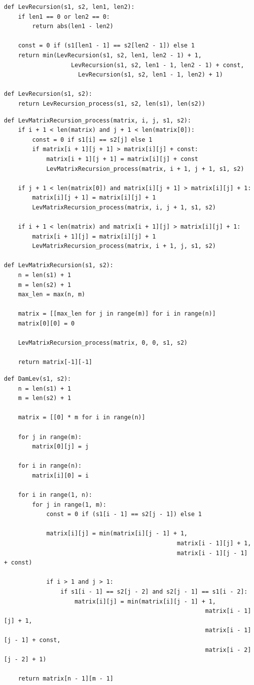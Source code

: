 \documentclass[12pt]{report}
\begin{document}
\begin{lstlisting}[label=some-code, caption = Расстояние Левенштейна - рекурсивный расчёт по формуле]
def LevRecursion(s1, s2, len1, len2):
	if len1 == 0 or len2 == 0:
		return abs(len1 - len2)
	
	const = 0 if (s1[len1 - 1] == s2[len2 - 1]) else 1
	return min(LevRecursion(s1, s2, len1, len2 - 1) + 1,
			   	   LevRecursion(s1, s2, len1 - 1, len2 - 1) + const,
			   		 LevRecursion(s1, s2, len1 - 1, len2) + 1)
			   
def LevRecursion(s1, s2):
	return LevRecursion_process(s1, s2, len(s1), len(s2))
\end{lstlisting}

\begin{lstlisting}[label=some-code, caption = Расстояние Левенштейна - алгоритм с рекурсией и матрицей]
def LevMatrixRecursion_process(matrix, i, j, s1, s2):
	if i + 1 < len(matrix) and j + 1 < len(matrix[0]):
		const = 0 if s1[i] == s2[j] else 1
		if matrix[i + 1][j + 1] > matrix[i][j] + const:
			matrix[i + 1][j + 1] = matrix[i][j] + const
			LevMatrixRecursion_process(matrix, i + 1, j + 1, s1, s2)
	
	if j + 1 < len(matrix[0]) and matrix[i][j + 1] > matrix[i][j] + 1:
		matrix[i][j + 1] = matrix[i][j] + 1
		LevMatrixRecursion_process(matrix, i, j + 1, s1, s2)
	
	if i + 1 < len(matrix) and matrix[i + 1][j] > matrix[i][j] + 1:
		matrix[i + 1][j] = matrix[i][j] + 1
		LevMatrixRecursion_process(matrix, i + 1, j, s1, s2)
		
def LevMatrixRecursion(s1, s2):
	n = len(s1) + 1
	m = len(s2) + 1
	max_len = max(n, m)
	
	matrix = [[max_len for j in range(m)] for i in range(n)]
	matrix[0][0] = 0
	
	LevMatrixRecursion_process(matrix, 0, 0, s1, s2)
	
	return matrix[-1][-1]
\end{lstlisting}

\begin{lstlisting}[label=some-code, caption = Расстояние Дамерау-Левенштейна]
def DamLev(s1, s2):
	n = len(s1) + 1
	m = len(s2) + 1
	
	matrix = [[0] * m for i in range(n)]
	
	for j in range(m):
		matrix[0][j] = j
	
	for i in range(n):
		matrix[i][0] = i
	
	for i in range(1, n):
		for j in range(1, m):
			const = 0 if (s1[i - 1] == s2[j - 1]) else 1
			
			matrix[i][j] = min(matrix[i][j - 1] + 1,
												 matrix[i - 1][j] + 1,
												 matrix[i - 1][j - 1] + const)
			
			if i > 1 and j > 1:
				if s1[i - 1] == s2[j - 2] and s2[j - 1] == s1[i - 2]:
					matrix[i][j] = min(matrix[i][j - 1] + 1,
														 matrix[i - 1][j] + 1,
														 matrix[i - 1][j - 1] + const,
														 matrix[i - 2][j - 2] + 1)
		
	return matrix[n - 1][m - 1]
\end{lstlisting}
\end{document}
